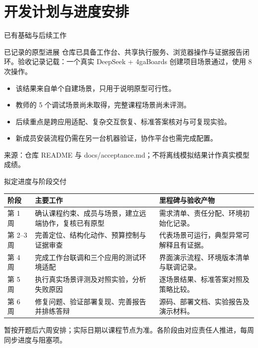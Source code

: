 \section{开发计划与进度安排}
\begin{frame}{已有基础与后续工作}
\begin{block}{已记录的原型进展}
仓库已具备工作台、共享执行服务、浏览器操作与证据报告闭环。验收记录记载：一个真实 DeepSeek + 4gaBoards 创建项目场景通过，使用 8 次操作。
\end{block}
\begin{itemize}
\item 该结果来自单个自建场景，只用于说明原型可行性。
\item 教师的 5 个调试场景尚未取得，完整课程场景尚未评测。
\item 后续重点是跨应用适配、复杂交互恢复、标准答案核对与可复现实验。
\item 新成员安装流程仍需在另一台机器验证，协作平台也需完成配置。
\end{itemize}
\vfill
\footnotesize 来源：仓库 README 与 docs/acceptance.md；不将离线模拟结果计作真实模型成绩。
\end{frame}

\begin{frame}{拟定进度与阶段交付}
\small
\begin{tabularx}{\textwidth}{lXX}
\toprule
阶段 & 主要工作 & 里程碑与验收产物 \\
\midrule
第 1 周 & 确认课程约束、成员与场景，建立远端协作，复核已有原型 & 需求清单、责任分配、环境初始化记录。\\
第 2--3 周 & 完善定位、结构化动作、预算控制与证据审查 & 代表场景可运行，典型异常可解释且有证据。\\
第 4 周 & 完成工作台联调和三个应用的测试环境适配 & 界面演示流程、环境版本清单与联调记录。\\
第 5 周 & 执行真实场景评测及对照实验，分析失败原因 & 逐场景结果、标准答案对照及策略比较。\\
第 6 周 & 修复问题、验证部署复现、完善报告并排练答辩 & 源码、部署文档、实验报告及演示材料。\\
\bottomrule
\end{tabularx}
\vfill
\footnotesize 暂按开题后六周安排；实际日期以课程节点为准。各阶段由对应责任人推进，每周同步进度与阻塞项。
\end{frame}
